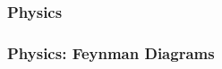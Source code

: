 \begin{frame}
\frametitle{Physics}
    
\end{frame}


\begin{frame}
\frametitle{Physics: Feynman Diagrams}
    
\end{frame}